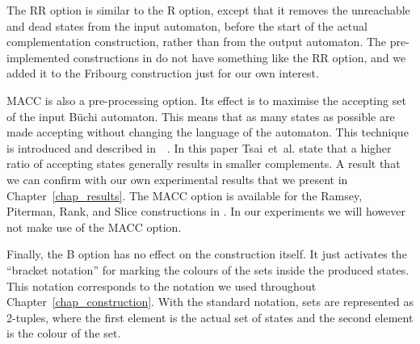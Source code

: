 The RR option is similar to the R option, except that it removes the unreachable and dead states from the input automaton, before the start of the actual complementation construction, rather than from the output automaton. The pre-implemented constructions in \goal{} do not have something like the RR option, and we added it to the Fribourg construction just for our own interest.

MACC is also a pre-processing option. Its effect is to maximise the accepting set of the input Büchi automaton. This means that as many states as possible are made accepting without changing the language of the automaton. This technique is introduced and described in~~\cite{2011_tsai}. In this paper Tsai~et~al. state that a higher ratio of accepting states generally results in smaller complements. A result that we can confirm with our own experimental results that we present in Chapter~\ref{chap_results}. The MACC option is available for the Ramsey, Piterman, Rank, and Slice constructions in \goal. In our experiments we will however not make use of the MACC option.

Finally, the B option has no effect on the construction itself. It just activates the ``bracket notation'' for marking the colours of the sets inside the produced states. This notation corresponds to the notation we used throughout Chapter~\ref{chap_construction}. With the standard notation, sets are represented as 2-tuples, where the first element is the actual set of states and the second element is the colour of the set.






